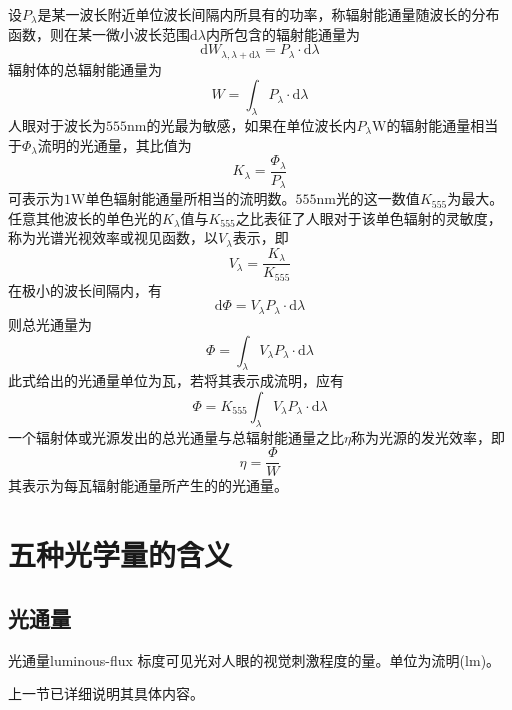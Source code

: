 \documentclass[cn,10pt,chinesefont=founder,math=mtpro2,cite=super,toc=onecol,twoside,openany]{elegantbook}
\begin{document}
设$P_\lambda$是某一波长附近单位波长间隔内所具有的功率，称辐射能通量随波长的分布函数，则在某一微小波长范围$\mathrm{d}\lambda$内所包含的辐射能通量为
\begin{equation}
\mathrm{d}W_{\lambda,\lambda+\mathrm{d}\lambda}=P_{\lambda}\cdot\mathrm{d}\lambda
\end{equation}
辐射体的总辐射能通量为
\begin{equation}
W=\int_{\lambda} P_{\lambda}\cdot\mathrm{d}\lambda
\end{equation}
人眼对于波长为$555\mathrm{nm}$的光最为敏感，如果在单位波长内$P_{\lambda}\mathrm{W}$的辐射能通量相当于$\varPhi_{\lambda}$流明的光通量，其比值为
\begin{equation}
K_{\lambda}=\frac{\varPhi_{\lambda}}{P_{\lambda}}
\end{equation}
可表示为$1\mathrm{W}$单色辐射能通量所相当的流明数。$555\mathrm{nm}$光的这一数值$K_{555}$为最大。任意其他波长的单色光的$K_{\lambda}$值与$K_{555}$之比表征了人眼对于该单色辐射的灵敏度，称为光谱光视效率或视见函数，以$V_{\lambda}$表示，即
\begin{equation}
V_{\lambda}=\frac{K_{\lambda}}{K_{555}}
\end{equation}
在极小的波长间隔内，有
\begin{equation}
\mathrm{d}\varPhi=V_{\lambda}P_{\lambda}\cdot\mathrm{d}\lambda
\end{equation}
则总光通量为
\begin{equation}
\varPhi=\int_{\lambda}V_{\lambda}P_{\lambda}\cdot\mathrm{d}\lambda
\end{equation}
此式给出的光通量单位为瓦，若将其表示成流明，应有
\begin{equation}
\varPhi=K_{555}\int_{\lambda}V_{\lambda}P_{\lambda}\cdot\mathrm{d}\lambda
\end{equation}
一个辐射体或光源发出的总光通量与总辐射能通量之比$\eta$称为光源的发光效率，即
\begin{equation}
\eta=\frac{\varPhi}{W}
\end{equation}
其表示为每瓦辐射能通量所产生的的光通量。

\section{五种光学量的含义}

\subsection{光通量}
\begin{definition}{光通量}{luminous-flux}
标度可见光对人眼的视觉刺激程度的量。单位为流明($\mathrm{lm}$)。
\end{definition}
上一节已详细说明其具体内容。
\end{document}
